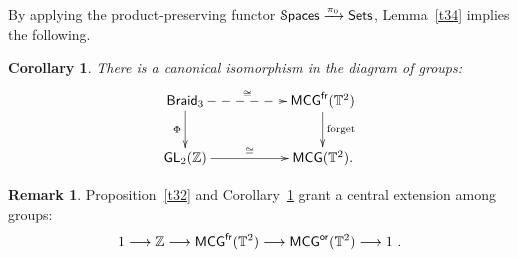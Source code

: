 \documentclass{amsart}
\newtheorem{cor}[theorem]{Corollary}
\theoremstyle{definition}
\newtheorem{remark}[theorem]{Remark}
\theoremstyle{remark}
\DeclareMathOperator{\Spaces}{\cS\mathsf{paces}}
\DeclareMathOperator{\fr}{\sf fr}
\newcommand{\xra}{\xrightarrow}
\DeclareMathOperator{\Braid}{{\sf Braid}_3}
\DeclareMathOperator{\GL}{\sf GL}
\begin{document}
By applying the product-preserving functor $\Spaces \xra{\pi_0} {\sf Sets}$, Lemma~\ref{t34} implies the following.
\begin{cor}\label{r2}
There is a canonical isomorphism in the diagram of groups:
\[
\xymatrix{
\Braid
\ar@{-->}[rr]^-{\cong}
\ar[d]_-{\Phi}
&&
{\sf MCG}^{\sf fr}(\TT^2)
\ar[d]^-{\rm forget}
\\
\GL_2(\ZZ)
\ar[rr]^-{\cong}
&&
{\sf MCG}(\TT^2)
.
}
\]


\end{cor}



\begin{remark}\label{r1}
Proposition~\ref{t32} and Corollary~\ref{r2} grant a central extension among groups:
\[
1
\longrightarrow
\ZZ
\longrightarrow
{\sf MCG}^{\fr}(\TT^2)
\longrightarrow
{\sf MCG}^{\sf or}(\TT^2)
\longrightarrow
1
~.
\\
\]

\end{remark}
\end{document}
